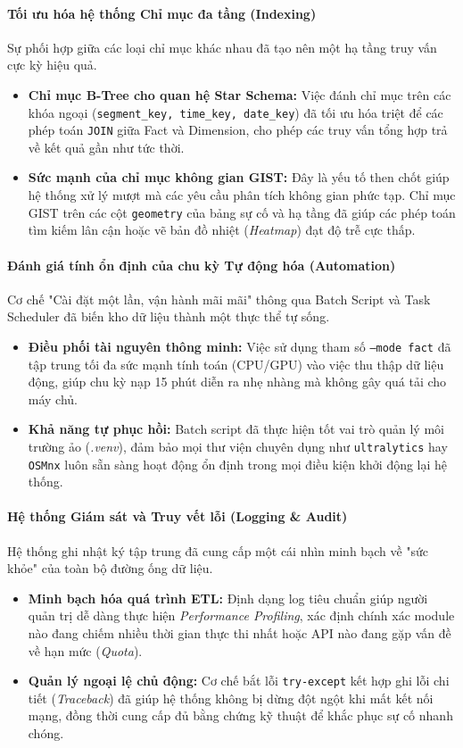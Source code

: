 \paragraph{Tối ưu hóa hệ thống Chỉ mục đa tầng (Indexing)}
Sự phối hợp giữa các loại chỉ mục khác nhau đã tạo nên một hạ tầng truy vấn cực kỳ hiệu quả.
\begin{itemize}
    \item \textbf{Chỉ mục B-Tree cho quan hệ Star Schema:} Việc đánh chỉ mục trên các khóa ngoại (\texttt{segment\_key, time\_key, date\_key}) đã tối ưu hóa triệt để các phép toán \texttt{JOIN} giữa Fact và Dimension, cho phép các truy vấn tổng hợp trả về kết quả gần như tức thời.
    \item \textbf{Sức mạnh của chỉ mục không gian GIST:} Đây là yếu tố then chốt giúp hệ thống xử lý mượt mà các yêu cầu phân tích không gian phức tạp. Chỉ mục GIST trên các cột \texttt{geometry} của bảng sự cố và hạ tầng đã giúp các phép toán tìm kiếm lân cận hoặc vẽ bản đồ nhiệt (\textit{Heatmap}) đạt độ trễ cực thấp.
\end{itemize}

\paragraph{Đánh giá tính ổn định của chu kỳ Tự động hóa (Automation)}
Cơ chế "Cài đặt một lần, vận hành mãi mãi" thông qua Batch Script và Task Scheduler đã biến kho dữ liệu thành một thực thể tự sống.
\begin{itemize}
    \item \textbf{Điều phối tài nguyên thông minh:} Việc sử dụng tham số \texttt{--mode fact} đã tập trung tối đa sức mạnh tính toán (CPU/GPU) vào việc thu thập dữ liệu động, giúp chu kỳ nạp 15 phút diễn ra nhẹ nhàng mà không gây quá tải cho máy chủ.
    \item \textbf{Khả năng tự phục hồi:} Batch script đã thực hiện tốt vai trò quản lý môi trường ảo (\textit{.venv}), đảm bảo mọi thư viện chuyên dụng như \texttt{ultralytics} hay \texttt{OSMnx} luôn sẵn sàng hoạt động ổn định trong mọi điều kiện khởi động lại hệ thống.
\end{itemize}

\paragraph{Hệ thống Giám sát và Truy vết lỗi (Logging \& Audit)}
Hệ thống ghi nhật ký tập trung đã cung cấp một cái nhìn minh bạch về "sức khỏe" của toàn bộ đường ống dữ liệu.
\begin{itemize}
    \item \textbf{Minh bạch hóa quá trình ETL:} Định dạng log tiêu chuẩn giúp người quản trị dễ dàng thực hiện \textit{Performance Profiling}, xác định chính xác module nào đang chiếm nhiều thời gian thực thi nhất hoặc API nào đang gặp vấn đề về hạn mức (\textit{Quota}).
    \item \textbf{Quản lý ngoại lệ chủ động:} Cơ chế bắt lỗi \texttt{try-except} kết hợp ghi lỗi chi tiết (\textit{Traceback}) đã giúp hệ thống không bị dừng đột ngột khi mất kết nối mạng, đồng thời cung cấp đủ bằng chứng kỹ thuật để khắc phục sự cố nhanh chóng.
\end{itemize}
